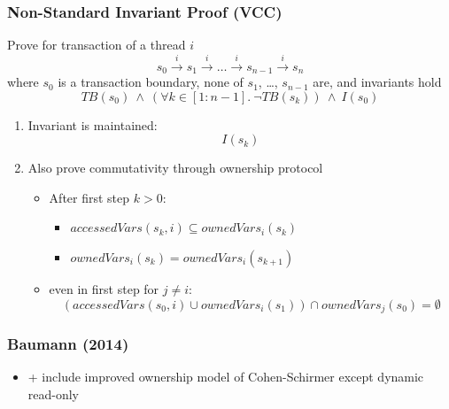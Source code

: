 \documentclass{beamer}
\begin{document}
\begin{frame}
\frametitle{Non-Standard Invariant Proof (VCC)}
Prove for transaction of a thread $i$
\[ s_0 \overset{i}\longrightarrow s_1  \overset{i}\longrightarrow \ldots  \overset{i}\longrightarrow s_{n-1} \overset{i}\longrightarrow s_n  \]
where $s_0$ is a transaction boundary, none of $s_1$, \ldots, $s_{n-1}$ are, and invariants hold
\[ \textit{TB}(s_0)  \ \land \ (\forall k \in [1:n-1]. \ \neg \textit{TB}(s_k)) \ \land \ I(s_0) \]
\begin{enumerate}
\item Invariant is maintained:
\[ I(s_k) \]

\item Also prove commutativity through ownership protocol
\begin{itemize}
	\item After first step $k > 0$:
	\begin{itemize}
		\item \(\textit{accessedVars}(s_k,i) \subseteq \textit{ownedVars}_i(s_k)\)
		\item \(\textit{ownedVars}_i(s_k) = \textit{ownedVars}_i(s_{k+1})\)
	\end{itemize}
	\item even in first step for $j\not=i$:
	\[ (\textit{accessedVars}(s_0,i) \cup \textit{ownedVars}_i(s_1)) \cap \textit{ownedVars}_j(s_0) = \emptyset \]
\end{itemize}
\end{enumerate} 
\end{frame}

\begin{frame}
\frametitle{Baumann (2014)}
\vfill
\begin{center}  \end{center}
\vfill
\begin{itemize}
	\item + include improved ownership model of Cohen-Schirmer except dynamic read-only
\end{itemize}
\end{frame}
\end{document}
